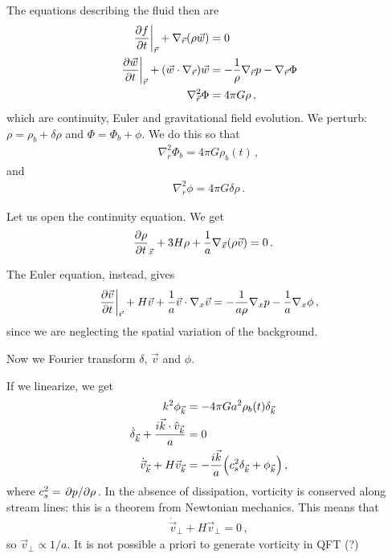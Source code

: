 \documentclass[main.tex]{subfiles}
\begin{document}
The equations describing the fluid then are 
%
\begin{subequations}
\begin{align}
\eval{\pdv{f}{t}}_{\vec{r}} + \nabla_{\vec{r}} \qty(\rho \vec{w}) &= 0  \\
\eval{\pdv{\vec{w}}{t}}_{\vec{r}} + \qty(\vec{w} \cdot \nabla_{\vec{r}}) \vec{w} &= - \frac{1}{\rho } \nabla_{\vec{r}} p - \nabla_{\vec{r}} \Phi  \\
\nabla^2_{\vec{r}} \Phi &= 4 \pi G \rho 
\,,
\end{align}
\end{subequations}
%
which are continuity, Euler and gravitational field evolution. 
We perturb: \(\rho = \rho_{b} + \delta \rho \) and \(\Phi = \Phi_{b} + \phi  \). 
We do this so that 
%
\begin{align}
\nabla^2_{r} \Phi_{b} = 4 \pi G \rho_{b} (t)
\,,
\end{align}
%
and 
%
\begin{align}
\nabla^2_{r} \phi = 4 \pi G \delta \rho 
\,.
\end{align}

Let us open the continuity equation. We get 
%
\begin{align}
\pdv{\rho }{t}_{\vec{x}} + 3 H \rho + \frac{1}{a} \nabla_{\vec{x}} \qty(\rho \vec{v}) &= 0
\,.
\end{align}

The Euler equation, instead, gives 
%
\begin{align}
\eval{\pdv{\vec{v}}{t}}_{\vec{r}} + 
H \vec{v}  + \frac{1}{a} \vec{v} \cdot \nabla_{x} \vec{v}
= - \frac{1}{a \rho } \nabla_{x} p
- \frac{1}{a} \nabla_{x} \phi 
\,,
\end{align}
%
since we are neglecting the spatial variation of the background.

Now we Fourier transform \(\delta \), \(\vec{v}\) and \(\phi \).

If we linearize, we get 
%
\begin{subequations}
\begin{align}
k^2 \phi_{\vec{k}} &= - 4 \pi G a^2 \rho_{b} (t) \delta_{\vec{k}}  \\
\dot{\delta}_{\vec{k}} + \frac{i \vec{k} \cdot \hat{v}_{\vec{k}}}{a} &=0  \\
\dot{\vec{v}}_{\vec{k}} + H \vec{v}_{\vec{k}} &= - \frac{i \vec{k}}{a} 
\qty(c_s^2 \delta_{\vec{k}} + \phi_{\vec{k}})
\,,
\end{align}
\end{subequations}
%
where \(c_s^2 = \pdv*{p}{\rho }\).
In the absence of dissipation, vorticity is conserved along stream lines: this is a theorem from Newtonian mechanics. 
This means that 
%
\begin{align}
\dot{\vec{v}}_{\perp} + H \vec{v}_{\perp} = 0
\,,
\end{align}
%
so \(\vec{v}_{\perp} \propto 1 / a\). 
It is not possible a priori to generate vorticity in QFT (?)
\end{document}

